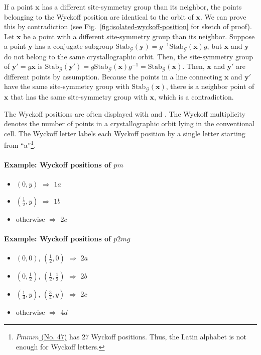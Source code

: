 If a point $\bm{x}$ has a different site-symmetry group than its neighbor, the points belonging to the Wyckoff position are identical to the orbit of $\bm{x}$.
We can prove this by contradiction (see Fig.~\ref{fig:isolated-wyckoff-position} for sketch of proof).
Let $\bm{x}$ be a point with a different site-symmetry group than its neighbor.
Suppose a point $\bm{y}$ has a conjugate subgroup $\mathrm{Stab}_{\mathcal{G}}(\bm{y}) = g^{-1}  \mathrm{Stab}_{\mathcal{G}}(\bm{x}) g$, but $\bm{x}$ and $\bm{y}$ do not belong to the same crystallographic orbit.
Then, the site-symmetry group of $\bm{y}' = g\bm{x}$ is $\mathrm{Stab}_{\mathcal{G}}(\bm{y}') = g \mathrm{Stab}_{\mathcal{G}}(\bm{x}) g^{-1} = \mathrm{Stab}_{\mathcal{G}}(\bm{x})$.
Then, $\bm{x}$ and $\bm{y}'$ are different points by assumption.
Because the points in a line connecting $\bm{x}$ and $\bm{y}'$ have the same site-symmetry group with $\mathrm{Stab}_{\mathcal{G}}(\bm{x})$, there is a neighbor point of $\bm{x}$ that has the same site-symmetry group with $\bm{x}$, which is a contradiction.

The Wyckoff positions are often displayed with  and .
The Wyckoff multiplicity denotes the number of points in a crystallographic orbit lying in the conventional cell.
The Wyckoff letter labels each Wyckoff position by a single letter starting from ``a''\footnote{
  \href{https://www.cryst.ehu.es/cgi-bin/cryst/programs/nph-wp-list}{$Pmmm$ (No. 47)} has 27 Wyckoff positions.
  Thus, the Latin alphabet is not enough for Wyckoff letters.
}.

\paragraph{Example: Wyckoff positions of $pm$}

\begin{itemize}
  \item $(0, y)$ $\Rightarrow$ $1a$
  \item $\left( \frac{1}{2}, y \right)$ $\Rightarrow$ $1b$
  \item otherwise $\Rightarrow$ $2c$
\end{itemize}

\paragraph{Example: Wyckoff positions of $p2mg$}

\begin{itemize}
  \item $(0, 0)$, $\left( \frac{1}{2}, 0 \right)$ $\Rightarrow$ $2a$
  \item $\left( 0, \frac{1}{2} \right)$, $\left( \frac{1}{2}, \frac{1}{2} \right)$ $\Rightarrow$ $2b$
  \item $\left( \frac{1}{4}, y \right)$, $\left( \frac{3}{4}, y \right)$ $\Rightarrow$ $2c$
  \item otherwise $\Rightarrow$ $4d$
\end{itemize}

